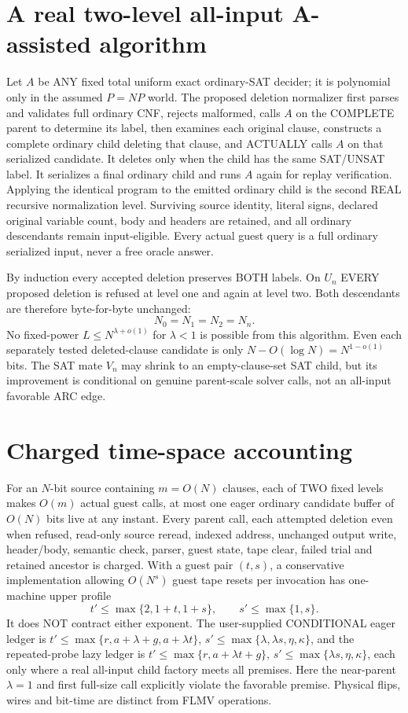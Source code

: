 \documentclass[11pt]{article}
\begin{document}
\section*{A real two-level all-input A-assisted algorithm}
Let $A$ be ANY fixed total uniform exact ordinary-SAT decider; it is polynomial only in the assumed $P=NP$ world. The proposed deletion normalizer first parses and validates full ordinary CNF, rejects malformed, calls $A$ on the COMPLETE parent to determine its label, then examines each original clause, constructs a complete ordinary child deleting that clause, and ACTUALLY calls $A$ on that serialized candidate. It deletes only when the child has the same SAT/UNSAT label. It serializes a final ordinary child and runs $A$ again for replay verification. Applying the identical program to the emitted ordinary child is the second REAL recursive normalization level. Surviving source identity, literal signs, declared original variable count, body and headers are retained, and all ordinary descendants remain input-eligible. Every actual guest query is a full ordinary serialized input, never a free oracle answer.

By induction every accepted deletion preserves BOTH labels. On $U_n$ EVERY proposed deletion is refused at level one and again at level two. Both descendants are therefore byte-for-byte unchanged:
\[
\boxed{N_0=N_1=N_2=N_n.}
\]
No fixed-power $L\le N^{\lambda+o(1)}$ for $\lambda<1$ is possible from this algorithm. Even each separately tested deleted-clause candidate is only $N-O(\log N)=N^{1-o(1)}$ bits. The SAT mate $V_n$ may shrink to an empty-clause-set SAT child, but its improvement is conditional on genuine parent-scale solver calls, not an all-input favorable ARC edge.

\section*{Charged time-space accounting}
For an $N$-bit source containing $m=O(N)$ clauses, each of TWO fixed levels makes $O(m)$ actual guest calls, at most one eager ordinary candidate buffer of $O(N)$ bits live at any instant. Every parent call, each attempted deletion even when refused, read-only source reread, indexed address, unchanged output write, header/body, semantic check, parser, guest state, tape clear, failed trial and retained ancestor is charged. With a guest pair $(t,s)$, a conservative implementation allowing $O(N^s)$ guest tape resets per invocation has one-machine upper profile
\[
t'\le\max\{2,1+t,1+s\},\qquad s'\le\max\{1,s\}.
\]
It does NOT contract either exponent. The user-supplied CONDITIONAL eager ledger is $t'\le\max\{r,a+\lambda+g,a+\lambda t\}$, $s'\le\max\{\lambda,\lambda s,\eta,\kappa\}$, and the repeated-probe lazy ledger is $t'\le\max\{r,a+\lambda t+g\}$, $s'\le\max\{\lambda s,\eta,\kappa\}$, each only where a real all-input child factory meets all premises. Here the near-parent $\lambda=1$ and first full-size call explicitly violate the favorable premise. Physical flips, wires and bit-time are distinct from FLMV operations.
\end{document}

